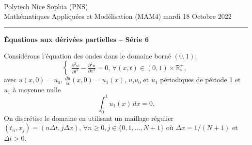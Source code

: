 \documentclass[12pt,a4paper]{article}
\begin{document}
 \hfill Polytech Nice Sophia (PNS)\\
\noindent Math\'ematiques Appliqu\'ees et Mod\'elisation (MAM4)
\hfill mardi 18 Octobre 2022\\

\hrule

\bigskip
\bigskip

\begin{center}{\bf \'Equations aux d\'eriv\'ees partielles --
S\'erie 6}\end{center}

\bigskip

\parskip 12pt
\noindent Consid\'erons l'\'equation des ondes dans le domaine born\'e $(0,1)$:
$$
\begin{cases}
\displaystyle\frac{\partial^2 u}{\partial t^2}-\frac{\partial^2 u}{\partial
  x^2}=0,\, \forall (x,t)\in(0,1)\times\mathbb{R}^+_*,
\end{cases}
$$
avec $u(x, 0) = u_0,\, \displaystyle\frac{\partial u}{\partial t}(x,0)=u_1(x)$,
$u$,$u_0$ et $u_1$ p\'eriodiques de p\'eriode 1 et $u_1$ \`a moyenne nulle
$$
\int_0^1 u_1(x)\,dx =0.
$$
On discr\'etise le domaine en utilisant un maillage r\'egulier
$(t_n,x_j)=(n\Delta t,j\Delta x)$,  $\forall n\ge 0,
j\in\{0,1,...,N+1\}$ o\`u $\Delta x=1/(N+1)$ et $\Delta t>0$.\\
\end{document}
